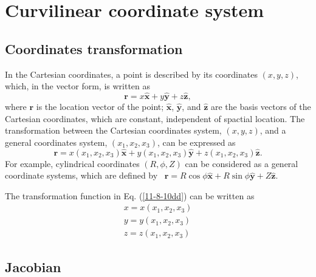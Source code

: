 \documentclass{llncs}
\begin{document}
\section{Curvilinear coordinate system}

\subsection{Coordinates transformation}

In the Cartesian coordinates, a point is described by its coordinates $(x, y,
z)$, which, in the vector form, is written as
\begin{equation}
  \mathbf{r}= x \hat{\mathbf{x}} + y \hat{\mathbf{y}} + z \hat{\mathbf{z}},
\end{equation}
where $\mathbf{r}$ is the location vector of the point; $\hat{\mathbf{x}}$,
$\hat{\mathbf{y}}$, and $\hat{\mathbf{z}}$ are the basis vectors of the
Cartesian coordinates, which are constant, independent of spactial location.
The transformation between the Cartesian coordinates system, $(x, y, z)$, and
a general coordinates system, $(x_1, x_2, x_3)$, can be expressed as
\begin{equation}
  \label{11-8-10dd} \mathbf{r}= x (x_1, x_2, x_3) \hat{\mathbf{x}} + y (x_1,
  x_2, x_3) \hat{\mathbf{y}} + z (x_1, x_2, x_3) \hat{\mathbf{z}} .
\end{equation}
For example, cylindrical coordinates $(R, \phi, Z)$ can be considered as a
general coordinate systems, which are defined by \ $\mathbf{r}= R \cos \phi
\hat{\mathbf{x}} + R \sin \phi \hat{\mathbf{y}} + Z \hat{\mathbf{z}}$.

The transformation function in Eq. (\ref{11-8-10dd}) can be written as
\begin{equation}
  \label{11-8-10} \begin{array}{l}
    x = x (x_1, x_2, x_3)\\
    y = y (x_1, x_2, x_3)\\
    z = z (x_1, x_2, x_3)
  \end{array}
\end{equation}

\subsection{Jacobian}
\end{document}
